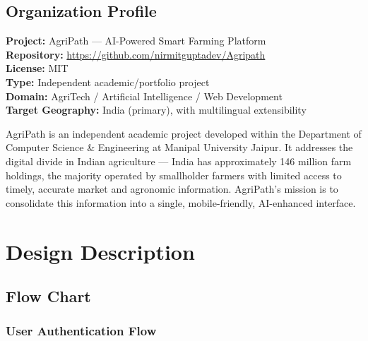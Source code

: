\documentclass[12pt,a4paper]{article}
\begin{document}
\subsection{Organization Profile}

\textbf{Project:} AgriPath --- AI-Powered Smart Farming Platform \\
\textbf{Repository:} \url{https://github.com/nirmitguptadev/Agripath} \\
\textbf{License:} MIT \\
\textbf{Type:} Independent academic/portfolio project \\
\textbf{Domain:} AgriTech / Artificial Intelligence / Web Development \\
\textbf{Target Geography:} India (primary), with multilingual extensibility

AgriPath is an independent academic project developed within the Department of Computer Science \& Engineering at Manipal University Jaipur. It addresses the digital divide in Indian agriculture --- India has approximately 146 million farm holdings, the majority operated by smallholder farmers with limited access to timely, accurate market and agronomic information. AgriPath's mission is to consolidate this information into a single, mobile-friendly, AI-enhanced interface.

\section{Design Description}

\subsection{Flow Chart}

\subsubsection*{User Authentication Flow}
\end{document}
